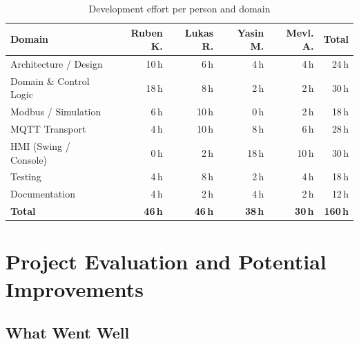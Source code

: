 \documentclass[12pt,a4paper]{article}
\begin{document}
\begin{table}[H]
\centering
\begin{tabular}{lrrrrr}
\toprule
\textbf{Domain} & \textbf{Ruben K.} & \textbf{Lukas R.} & \textbf{Yasin M.} & \textbf{Mevl. A.} & \textbf{Total} \\
\midrule
Architecture / Design   & 10\,h &  6\,h &  4\,h &  4\,h & 24\,h \\
Domain \& Control Logic & 18\,h &  8\,h &  2\,h &  2\,h & 30\,h \\
Modbus / Simulation     &  6\,h & 10\,h &  0\,h &  2\,h & 18\,h \\
MQTT Transport          &  4\,h & 10\,h &  8\,h &  6\,h & 28\,h \\
HMI (Swing / Console)   &  0\,h &  2\,h & 18\,h & 10\,h & 30\,h \\
Testing                 &  4\,h &  8\,h &  2\,h &  4\,h & 18\,h \\
Documentation           &  4\,h &  2\,h &  4\,h &  2\,h & 12\,h \\
\midrule
\textbf{Total} & \textbf{46\,h} & \textbf{46\,h} & \textbf{38\,h} & \textbf{30\,h} & \textbf{160\,h} \\
\bottomrule
\end{tabular}
\caption{Development effort per person and domain}
\end{table}

\section{Project Evaluation and Potential Improvements}

\subsection{What Went Well}
\end{document}
